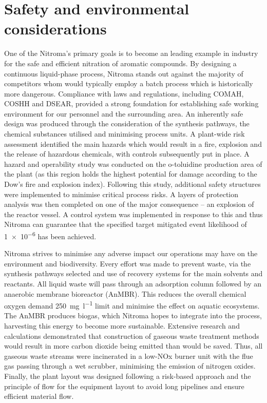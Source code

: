 \section*{Safety and environmental considerations}

 One of the Nitroma's primary goals is to become an leading example in industry for the safe and efficient nitration of aromatic compounds. By designing a continuous liquid-phase process, Nitroma stands out against the majority of competitors whom would typically employ a batch process which is historically more dangerous. Compliance with laws and regulations, including COMAH, COSHH and DSEAR, provided a strong foundation for establishing safe working environment for our personnel and the surrounding area. An inherently safe design was produced through the consideration of the synthesis pathways, the chemical substances utilised and minimising process units. A plant-wide risk assessment identified the main hazards which would result in a fire, explosion and the release of hazardous chemicals, with controls subsequently put in place. A hazard and operability study was conducted on the o-toluidine production area of the plant (as this region holds the highest potential for damage according to the Dow's fire and explosion index). Following this study, additional safety structures were implemented to minimise critical process risks. A layers of protection analysis was then completed on one of the major consequence – an explosion of the reactor vessel. A control system was implemented in response to this and thus Nitroma can guarantee that the specified target mitigated event likelihood of \num{1e-6} has been achieved.

Nitroma strives to minimise any adverse impact our operations may have on the environment and biodiversity. Every effort was made to prevent waste, via the synthesis pathways selected and use of recovery systems for the main solvents and reactants. All liquid waste will pass through an adsorption column followed by an anaerobic membrane bioreactor (AnMBR). This reduces the overall chemical oxygen demand \SI{250}{\mg\per\litre} limit and minimise the effect on aquatic ecosystems. The AnMBR produces biogas, which Nitroma hopes to integrate into the process, harvesting this energy to become more sustainable. Extensive research and calculations demonstrated that construction of gaseous waste treatment methods would result in more carbon dioxide being emitted than would be saved. Thus, all gaseous waste streams were incinerated in a low-NOx burner unit with the flue gas passing through a wet scrubber, minimising the emission of nitrogen oxides. Finally, the plant layout was designed following a risk-based approach and the principle of flow for the equipment layout to avoid long pipelines and ensure efficient material flow. 